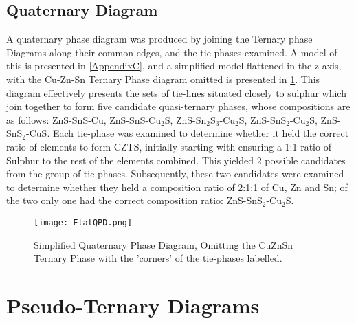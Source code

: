 
\subsection{Quaternary Diagram}

A quaternary phase diagram was produced by joining the Ternary phase Diagrams along their common edges, and the tie-phases examined. A model of this is presented in \ref{AppendixC}, and a simplified model flattened in the z-axis, with the Cu-Zn-Sn Ternary Phase diagram omitted is presented in \ref{fig:298KQPD}. This diagram effectively presents the sets of tie-lines situated closely to sulphur which join together to form five candidate quasi-ternary phases, whose compositions are as follows: ZnS-SnS-Cu, ZnS-SnS-Cu$_2$S, ZnS-Sn$_2$S$_3$-Cu$_2$S, ZnS-SnS$_2$-Cu$_2$S, ZnS-SnS$_2$-CuS. Each tie-phase was examined to determine whether it held the correct ratio of elements to form CZTS, initially starting with ensuring a 1:1 ratio of Sulphur to the rest of the elements combined. This yielded 2 possible candidates from the group of tie-phases. Subsequently, these two candidates were examined to determine whether they held a composition ratio of 2:1:1 of Cu, Zn and Sn; of the two only one had the correct composition ratio: ZnS-SnS$_2$-Cu$_2$S.


\begin{figure}[ht]
\centering
    \texttt{[image: FlatQPD.png]}
    \caption{Simplified Quaternary Phase Diagram, Omitting the CuZnSn Ternary Phase with the 'corners' of the tie-phases labelled.}
\label{fig:298KQPD}
\end{figure}

\section{Pseudo-Ternary Diagrams}

